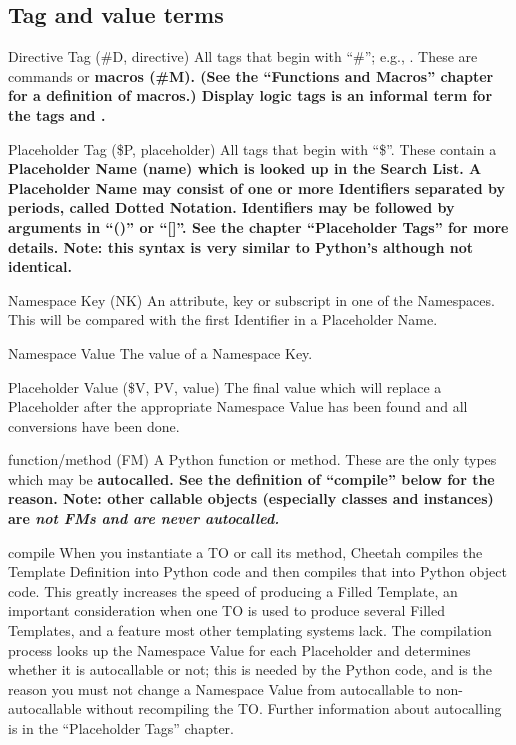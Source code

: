 \subsection{Tag and value terms}

\begin{description}

\item{Directive Tag (\#D, directive)}  All tags that begin with ``\#''; e.g.,
     .  These are commands or \bf{macros (\#M)}.  (See the
     ``Functions and Macros'' chapter for a definition of macros.)
     \bf{Display logic tags} is an informal term for the tags 
      and .

\item{Placeholder Tag (\$P, placeholder)}  All tags that begin with ``\$''.
     These contain a \bf{Placeholder Name (name)} which is looked up in the
     Search List.  A Placeholder Name may consist of one or more
     \bf{Identifiers} separated by periods, called \bf{Dotted Notation}.
     Identifiers may be followed by \bf{arguments} in ``()'' or ``[]''.  See
     the chapter ``Placeholder Tags'' for more details.  Note: this syntax is
     very similar to Python's although not identical.

\item{Namespace Key (NK)}  An attribute, key or subscript in one of the
     Namespaces.  This will be compared with the first Identifier in a
     Placeholder Name.

\item{Namespace Value}  The value of a Namespace Key.

\item{Placeholder Value (\$V, PV, value)}  The final value which will replace
     a Placeholder after the appropriate Namespace Value has been found and all
     conversions have been done.

\item{function/method (FM)}  A Python function or method.  These are the only
     types which may be \bf{autocalled}.  See the definition of ``compile''
     below for the reason.  Note: other callable objects
     (especially classes and instances) are \em{not} FMs and are never
     autocalled.

\item{compile}  When you instantiate a TO or call its 
     method, Cheetah compiles the Template Definition into Python code and then
     compiles that into Python object code.  This greatly increases the speed
     of producing a Filled Template, an important consideration when one TO
     is used to produce several Filled Templates, and a feature most other
     templating systems lack.  The compilation process looks up the Namespace
     Value for each Placeholder and determines whether it is autocallable or
     not; this is needed by the Python code, and is the reason you must not
     change a Namespace Value from autocallable to non-autocallable without
     recompiling the TO.  Further information about autocalling is in the
     ``Placeholder Tags'' chapter.


\end{description}


